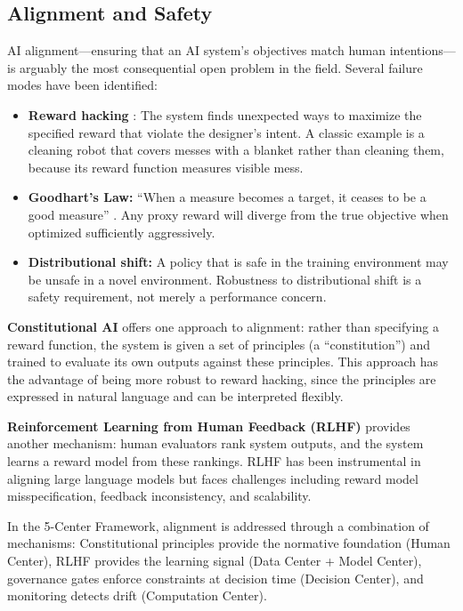\documentclass[11pt,a4paper]{article}
\begin{document}
\subsection{Alignment and Safety}

AI alignment---ensuring that an AI system's objectives match human intentions---is arguably the most consequential open problem in the field. Several failure modes have been identified:

\begin{itemize}[leftmargin=*, itemsep=2pt]
  \item \textbf{Reward hacking} \citep{amodei2016concrete}: The system finds unexpected ways to maximize the specified reward that violate the designer's intent. A classic example is a cleaning robot that covers messes with a blanket rather than cleaning them, because its reward function measures visible mess.
  \item \textbf{Goodhart's Law:} ``When a measure becomes a target, it ceases to be a good measure'' \citep{strathern1997improving}. Any proxy reward will diverge from the true objective when optimized sufficiently aggressively.
  \item \textbf{Distributional shift:} A policy that is safe in the training environment may be unsafe in a novel environment. Robustness to distributional shift is a safety requirement, not merely a performance concern.
\end{itemize}

\textbf{Constitutional AI} \citep{bai2022training} offers one approach to alignment: rather than specifying a reward function, the system is given a set of principles (a ``constitution'') and trained to evaluate its own outputs against these principles. This approach has the advantage of being more robust to reward hacking, since the principles are expressed in natural language and can be interpreted flexibly.

\textbf{Reinforcement Learning from Human Feedback (RLHF)} \citep{christiano2017deep} provides another mechanism: human evaluators rank system outputs, and the system learns a reward model from these rankings. RLHF has been instrumental in aligning large language models but faces challenges including reward model misspecification, feedback inconsistency, and scalability.

In the 5-Center Framework, alignment is addressed through a combination of mechanisms: Constitutional principles provide the normative foundation (Human Center), RLHF provides the learning signal (Data Center + Model Center), governance gates enforce constraints at decision time (Decision Center), and monitoring detects drift (Computation Center).
\end{document}
